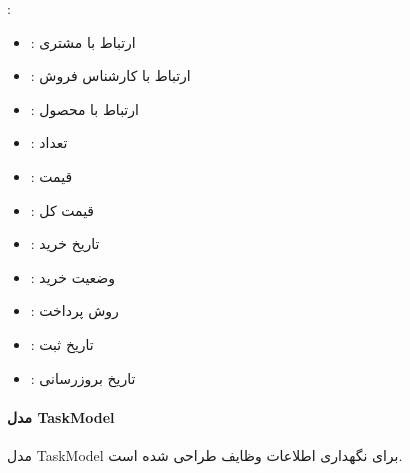 \documentclass[letterpaper,10pt,english]{sphinxmanual}
\begin{document}
\sphinxAtStartPar
{}:
\begin{itemize}
\item {} 
\sphinxAtStartPar
{}: ارتباط با مشتری

\item {} 
\sphinxAtStartPar
{}: ارتباط با کارشناس فروش

\item {} 
\sphinxAtStartPar
{}: ارتباط با محصول

\item {} 
\sphinxAtStartPar
{}: تعداد

\item {} 
\sphinxAtStartPar
{}: قیمت

\item {} 
\sphinxAtStartPar
{}: قیمت کل

\item {} 
\sphinxAtStartPar
{}: تاریخ خرید

\item {} 
\sphinxAtStartPar
{}: وضعیت خرید

\item {} 
\sphinxAtStartPar
{}: روش پرداخت

\item {} 
\sphinxAtStartPar
{}: تاریخ ثبت

\item {} 
\sphinxAtStartPar
{}: تاریخ بروزرسانی

\end{itemize}


\paragraph{مدل TaskModel}
\label{\detokenize{modules/core:taskmodel}}
\sphinxAtStartPar
مدل TaskModel برای نگهداری اطلاعات وظایف طراحی شده است.
\end{document}

